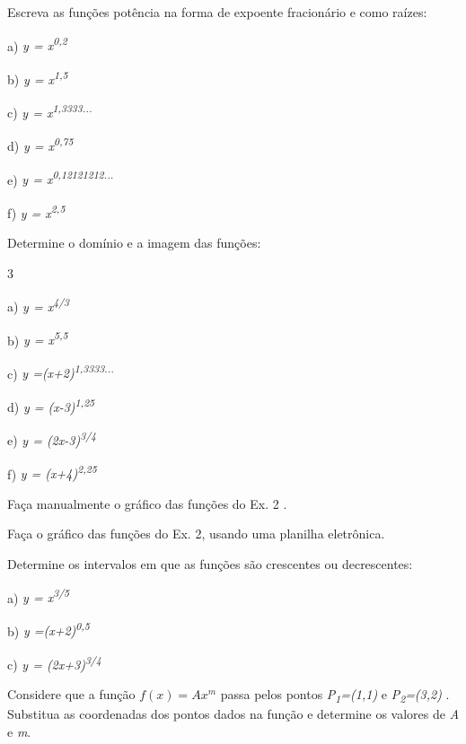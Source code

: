 \begin{exercicios}
	\exitem{}  Escreva as funções potência na forma de expoente fracionário e como raízes:
	\begin{multicols}{3}

		a) \textit{y = x\textsuperscript{0,2\quad }}
		
		b) \textit{y = x\textsuperscript{1,5}}\textsuperscript{}

		c) \textit{y = x\textsuperscript{1,3333... }}
		
		d) \textit{y = x\textsuperscript{0,75\quad }}

		e) \textit{y = x\textsuperscript{0,12121212...}}

		f) \textit{y = x\textsuperscript{2,5}}
	\end{multicols}

	\exitem{} Determine o domínio e a imagem das funções:

\begin{multicols}3
	
	a) \textit{y = x\textsuperscript{4/3}}

	b) \textit{y = x\textsuperscript{5,5}}
	
	c) \textit{y =(x+2)\textsuperscript{1,3333...}}

	d) \textit{y = (x-3)\textsuperscript{1,25\quad }}
	
	e) \textit{y = (2x-3)\textsuperscript{3/4}}

	f) \textit{y = (x+4)\textsuperscript{2,25}}
\end{multicols}

	\exitem{} Faça manualmente o gráfico das funções do Ex. 2 .

	\exitem{} Faça o gráfico das funções do Ex. 2, usando uma planilha eletrônica.

	\exitem{} Determine os intervalos em que as funções são crescentes ou decrescentes:

	\begin{multicols}{2}
	
	a) \textit{y = x\textsuperscript{3/5\quad }}

	b) \textit{y =(x+2)\textsuperscript{0,5~ }}

	c) \textit{y = (2x+3)\textsuperscript{3/4}}
	
	\end{multicols}
	
	\exitem{} Considere que a função  \( f \left( x \right) =Ax^{m} \) passa pelos pontos \textit{P\textsubscript{1}=(1,1)} e \textit{P\textsubscript{2}=(3,2)} . Substitua as coordenadas dos pontos dados na função e determine os valores de \textit{A} e \textit{m}. 

\end{exercicios}
